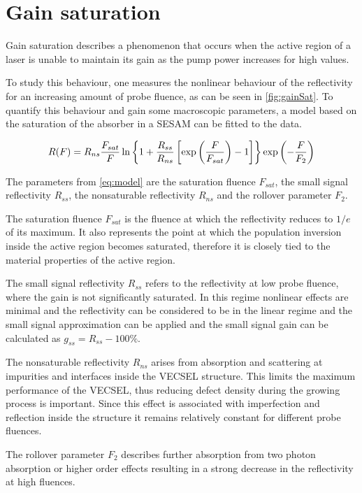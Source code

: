 \section{Gain saturation}

Gain saturation describes a phenomenon that occurs when the active region of a laser is unable to maintain its gain as the pump power increases for high values. 

To study this behaviour, one measures the nonlinear behaviour of the reflectivity for an increasing amount of probe fluence, as can be seen in \cref{fig:gainSat}. To quantify this behaviour and gain some macroscopic parameters, a model based on the saturation of the absorber in a SESAM can be fitted to the data. 

\begin{equation}
    \centering
    R(F)=R_{ns} \frac{F_{sat}}{F} \ln\left\{1 + \frac{R_{ss}}{R_{ns}} \left[\exp{ \left(\frac{F}{F_{sat}}\right) } - 1\right]\right\} \exp{\left(-\frac{F}{F_2}\right)}
    \label{eq:model}
\end{equation}

The parameters from \cref{eq:model} are the saturation fluence $F_{sat}$, the small signal reflectivity $R_{ss}$, the nonsaturable reflectivity $R_{ns}$ and the rollover parameter $F_{2}$.

The saturation fluence $F_{sat}$ is the fluence at which the reflectivity reduces to $1/e$ of its maximum. It also represents the point at which the population inversion inside the active region becomes saturated, therefore it is closely tied to the material properties of the active region.

The small signal reflectivity $R_{ss}$ refers to the reflectivity at low probe fluence, where the gain is not significantly saturated. In this regime nonlinear effects are minimal and the reflectivity can be considered to be in the linear regime and the small signal approximation can be applied and the small signal gain can be calculated as $g_{ss}=R_{ss}-100\%$.

The nonsaturable reflectivity $R_{ns}$ arises from absorption and scattering at impurities and interfaces inside the VECSEL structure. This limits the maximum performance of the VECSEL, thus reducing defect density during the growing process is important. Since this effect is associated with imperfection and reflection inside the structure it remains relatively constant for different probe fluences. 

The rollover parameter $F_2$ describes further absorption from two photon absorption or higher order effects resulting in a strong decrease in the reflectivity at high fluences.

